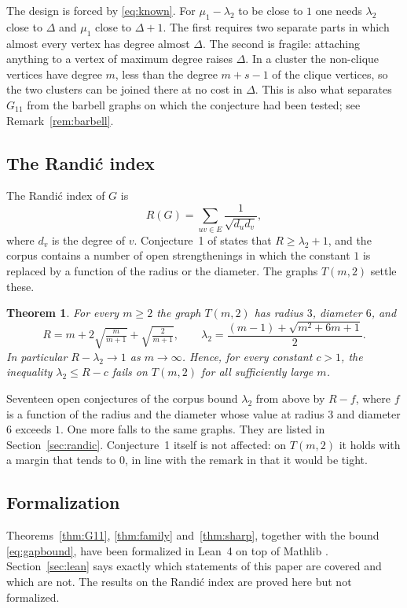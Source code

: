 \documentclass[11pt]{amsart}
\newtheorem{theorem}{Theorem}[section]
\theoremstyle{definition}
\theoremstyle{remark}
\begin{document}
The design is forced by \eqref{eq:known}. For $\mu_1-\lambda_2$ to be close to $1$ one needs
$\lambda_2$ close to $\Delta$ and $\mu_1$ close to $\Delta+1$. The first requires two separate
parts in which almost every vertex has degree almost $\Delta$. The second is fragile: attaching
anything to a vertex of maximum degree raises $\Delta$. In a cluster the non-clique vertices
have degree $m$, less than the degree $m+s-1$ of the clique vertices, so the two clusters can be
joined there at no cost in $\Delta$. This is also what separates $G_{11}$ from the barbell graphs
on which the conjecture had been tested; see Remark~\ref{rem:barbell}.

\subsection*{The Randi\'c index}
The Randi\'c index \cite{Randic} of $G$ is
\[
R(G)=\sum_{uv\in E}\frac{1}{\sqrt{d_ud_v}} ,
\]
where $d_v$ is the degree of $v$. Conjecture~1 of \cite{Cazenave} states that
$R\ge\lambda_2+1$, and the corpus contains a number of open strengthenings in which the
constant $1$ is replaced by a function of the radius or the diameter. The graphs $T(m,2)$
settle these.

\begin{theorem}\label{thm:randic}
For every $m\ge 2$ the graph $T(m,2)$ has radius $3$, diameter $6$, and
\[
R=m+2\sqrt{\tfrac{m}{m+1}}+\sqrt{\tfrac{2}{m+1}},\qquad
\lambda_2=\frac{(m-1)+\sqrt{m^2+6m+1}}{2}.
\]
In particular $R-\lambda_2\to1$ as $m\to\infty$. Hence, for every constant $c>1$, the inequality
$\lambda_2\le R-c$ fails on $T(m,2)$ for all sufficiently large $m$.
\end{theorem}

Seventeen open conjectures of the corpus bound $\lambda_2$ from above by $R-f$, where $f$ is a
function of the radius and the diameter whose value at radius $3$ and diameter $6$ exceeds $1$.
One more falls to the same graphs. They are listed in Section~\ref{sec:randic}. Conjecture~1
itself is not affected: on $T(m,2)$ it holds with a margin that tends to $0$, in line with the
remark in \cite{Cazenave} that it would be tight.

\subsection*{Formalization}
Theorems~\ref{thm:G11}, \ref{thm:family} and~\ref{thm:sharp}, together with the bound
\eqref{eq:gapbound}, have been formalized in Lean~4 \cite{Lean4} on top of Mathlib
\cite{Mathlib}. Section~\ref{sec:lean} says exactly which statements of this paper are covered
and which are not. The results on the Randi\'c index are proved here but not formalized.
\end{document}
